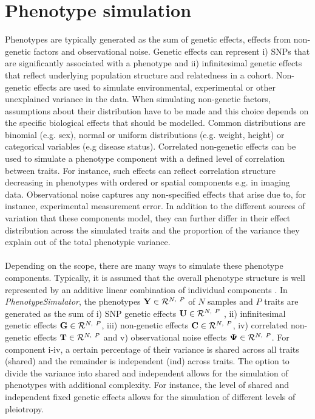 \section{Phenotype simulation}
\label{section:phenotype-simulation}

Phenotypes are typically generated as the sum of genetic effects, effects from non-genetic factors and observational noise. Genetic effects can represent i) SNPs that are significantly associated with a phenotype and ii) infinitesimal genetic effects that reflect underlying population structure and relatedness in a cohort. Non-genetic effects are used to simulate environmental, experimental or other unexplained variance in the data. When simulating non-genetic factors, assumptions about their distribution have to be made and this choice depends on the specific biological effects that should be modelled. Common distributions are binomial (e.g. sex), normal or uniform distributions (e.g. weight, height) or categorical variables (e.g disease status).  Correlated non-genetic effects can be used to simulate a phenotype component with a defined level of correlation between traits. For instance, such effects can reflect correlation structure decreasing in phenotypes with ordered or spatial components e.g. in imaging data. Observational noise captures any non-specified effects that arise due to, for instance, experimental measurement error. In addition to the different sources of variation that these components model, they can further differ in their effect distribution across the simulated traits and the proportion of the variance they explain out of the total phenotypic variance. 
\\
\\
Depending on the scope, there are many ways to simulate these phenotype components. Typically, it is assumed that the overall phenotype structure is well represented by an additive linear combination of individual components \citep{Stephens2013,Marigorta2014,Zhou2014,Loh2014}. In \textit{PhenotypeSimulator}, the phenotypes \( \boldsymbol{\mathbf{Y}} \in \mathcal{R}^{N,~P}\) of \(N\) samples and \(P\) traits are generated as the sum of i) SNP genetic effects \( \boldsymbol{\mathbf{U}}  \in \mathcal{R}^{N,~P}\) , ii) infinitesimal genetic effects \( \boldsymbol{\mathbf{G}} \in \mathcal{R}^{N,~P}\), iii) non-genetic effects \( \boldsymbol{\mathbf{C}} \in \mathcal{R}^{N,~P}\),  iv) correlated non-genetic effects \( \boldsymbol{\mathbf{T}} \in \mathcal{R}^{N,~P}\) and  v) observational noise effects \( \boldsymbol{\mathbf{\Psi}} \in \mathcal{R}^{N,~P}\). For component i-iv, a certain percentage of their variance is shared across all traits (shared) and the remainder is independent (ind) across traits. The option to divide the variance into shared and independent allows for the simulation of phenotypes with additional complexity. For instance, the level of shared and independent fixed genetic effects allows for the simulation of different levels of pleiotropy.
